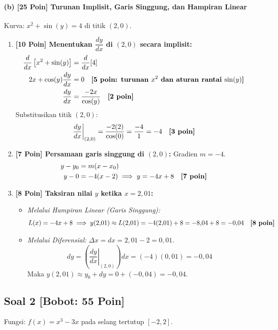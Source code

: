 \documentclass[11pt,a4paper]{article}
\begin{document}
\paragraph{(b) [25 Poin] Turunan Implisit, Garis Singgung, dan Hampiran Linear}
Kurva: $x^2 + \sin(y) = 4$ di titik $(2, 0)$.
\begin{enumerate}[label=(\roman*), leftmargin=18pt]
    \item \textbf{[10 Poin] Menentukan $\dfrac{dy}{dx}$ di $(2, 0)$ secara implisit:}
    \begin{align*}
        \frac{d}{dx}\left[ x^2 + \sin(y) \right] &= \frac{d}{dx}[4] \\
        2x + \cos(y) \frac{dy}{dx} &= 0 \quad \text{\textbf{[5 poin: turunan $x^2$ dan aturan rantai $\sin(y)$]}} \\
        \frac{dy}{dx} &= \frac{-2x}{\cos(y)} \quad \text{\textbf{[2 poin]}}
    \end{align*}
    Substitusikan titik $(2, 0)$:
    \[
    \left.\frac{dy}{dx}\right|_{(2, 0)} = \frac{-2(2)}{\cos(0)} = \frac{-4}{1} = -4 \quad \text{\textbf{[3 poin]}}
    \]

    \item \textbf{[7 Poin] Persamaan garis singgung di $(2, 0)$:}
    Gradien $m = -4$.
    \begin{align*}
        y - y_0 &= m (x - x_0) \\
        y - 0 &= -4 (x - 2) \implies y = -4x + 8 \quad \text{\textbf{[7 poin]}}
    \end{align*}

    \item \textbf{[8 Poin] Taksiran nilai $y$ ketika $x = 2{,}01$:}
    \begin{itemize}
        \item \textit{Melalui Hampiran Linear (Garis Singgung):}
        \[
        L(x) = -4x + 8 \implies y(2{,}01) \approx L(2{,}01) = -4(2{,}01) + 8 = -8{,}04 + 8 = -0{,}04 \quad \text{\textbf{[8 poin]}}
        \]
        \item \textit{Melalui Diferensial:}
        $\Delta x = dx = 2{,}01 - 2 = 0{,}01$.
        \[
        dy = \left(\left.\frac{dy}{dx}\right|_{(2, 0)}\right) dx = (-4)(0{,}01) = -0{,}04
        \]
        Maka $y(2{,}01) \approx y_0 + dy = 0 + (-0{,}04) = -0{,}04$.
    \end{itemize}
\end{enumerate}

\vspace{10pt}
\subsection*{Soal 2 [Bobot: 55 Poin]}
Fungsi: $f(x) = x^3 - 3x$ pada selang tertutup $[-2, 2]$.
\end{document}

